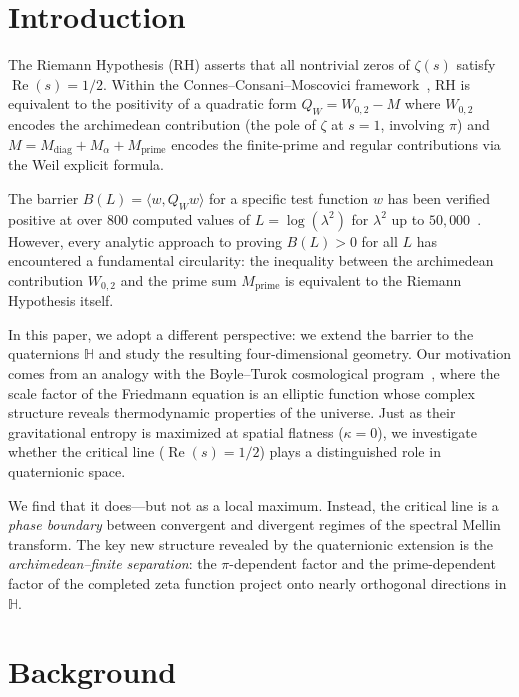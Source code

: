 \documentclass[11pt,a4paper]{article}
\theoremstyle{definition}
\DeclareMathOperator{\re}{Re}
\begin{document}
\section{Introduction}

The Riemann Hypothesis (RH) asserts that all nontrivial zeros of $\zeta(s)$ satisfy $\re(s) = 1/2$. Within the Connes--Consani--Moscovici framework~\cite{CCM2025}, RH is equivalent to the positivity of a quadratic form $Q_W = W_{0,2} - M$ where $W_{0,2}$ encodes the archimedean contribution (the pole of $\zeta$ at $s=1$, involving $\pi$) and $M = M_{\mathrm{diag}} + M_\alpha + M_{\mathrm{prime}}$ encodes the finite-prime and regular contributions via the Weil explicit formula.

The barrier $B(L) = \langle w, Q_W w \rangle$ for a specific test function $w$ has been verified positive at over 800 computed values of $L = \log(\lambda^2)$ for $\lambda^2$ up to $50{,}000$~\cite{VaughanBarrier}. However, every analytic approach to proving $B(L) > 0$ for all $L$ has encountered a fundamental circularity: the inequality between the archimedean contribution $W_{0,2}$ and the prime sum $M_{\mathrm{prime}}$ is equivalent to the Riemann Hypothesis itself.

In this paper, we adopt a different perspective: we extend the barrier to the quaternions $\mathbb{H}$ and study the resulting four-dimensional geometry. Our motivation comes from an analogy with the Boyle--Turok cosmological program~\cite{BoyleTurok2022a,BoyleTurok2022b}, where the scale factor of the Friedmann equation is an elliptic function whose complex structure reveals thermodynamic properties of the universe. Just as their gravitational entropy is maximized at spatial flatness ($\kappa = 0$), we investigate whether the critical line ($\re(s) = 1/2$) plays a distinguished role in quaternionic space.

We find that it does---but not as a local maximum. Instead, the critical line is a \emph{phase boundary} between convergent and divergent regimes of the spectral Mellin transform. The key new structure revealed by the quaternionic extension is the \emph{archimedean--finite separation}: the $\pi$-dependent factor and the prime-dependent factor of the completed zeta function project onto nearly orthogonal directions in $\mathbb{H}$.

\section{Background}
\end{document}
